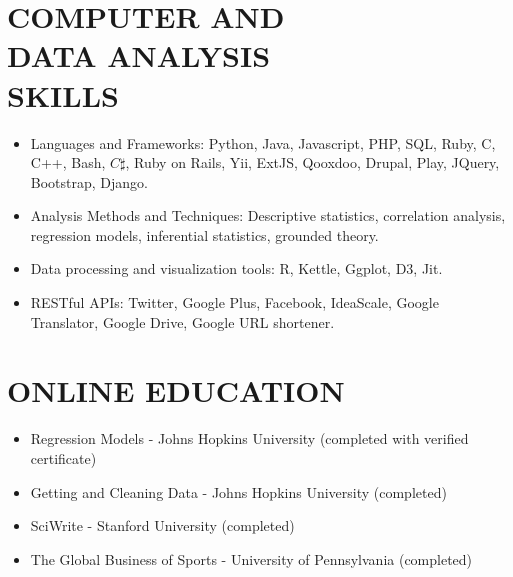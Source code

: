 \documentclass[line,margin]{res}
\begin{document}
\begin{resume}
\section{COMPUTER AND \\ DATA ANALYSIS \\ SKILLS} 
\begin{itemize} \itemsep -2pt      
\item Languages and Frameworks: Python, Java, Javascript, PHP, SQL, Ruby, C, C++, Bash, $C\sharp$, Ruby on Rails, Yii, ExtJS, Qooxdoo, Drupal, Play, JQuery, Bootstrap, Django.
\item Analysis Methods and Techniques: Descriptive statistics, correlation analysis, regression models, inferential statistics, grounded theory.
\item Data processing and visualization tools: R, Kettle, Ggplot, D3, Jit. 
\item RESTful APIs: Twitter, Google Plus, Facebook, IdeaScale, Google Translator, Google Drive, Google URL shortener.
\end{itemize}

\section{ONLINE EDUCATION}  
\begin{itemize} \itemsep -2pt
\item Regression Models - Johns Hopkins University (completed with verified certificate)
\item Getting and Cleaning Data - Johns Hopkins University (completed)
\item SciWrite - Stanford University (completed)
\item The Global Business of Sports - University of Pennsylvania (completed)
\end{itemize}


\end{resume}
\end{document}
